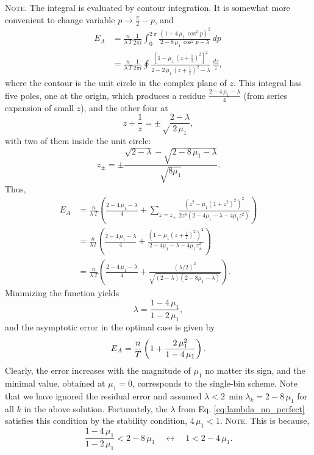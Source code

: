 \documentclass[reprint, floatfix]{revtex4-1}
\newcommand{\note}[1]{{\color{DarkGreen}\footnotesize \textsc{Note.} #1}}
\newcommand{\Err}{E}
\begin{document}
\note{The integral is evaluated by contour integration.
%
It is somewhat more convenient to change variable $p \to \frac{ \pi } { 2 } - p$,
and
$$
\begin{aligned}
\Err_A
&=
\frac{n}{\lambda \, T}
\frac{1}{2 \pi i}
\int_0^{2 \, \pi}
\frac{ \left(1 - 4 \, \mu_1 \, \cos^2 p \right)^2 }
{ 2 - 8 \, \mu_1 \, \cos^2 p - \lambda }
\, dp
\\
&=
\frac{n}{\lambda \, T}
\frac{1}{2 \pi i}
\oint
\frac{ \left[1 - \mu_1 \, \left(z+\frac{1}{z}\right)^2 \right]^2 }
{ 2 - 2 \, \mu_1 \, \left(z + \frac{1}{z}\right)^2 - \lambda }
\, \frac{dz}{z},
\end{aligned}
$$
where the contour is the unit circle
in the complex plane of $z$.
%
This integral has five poles, one at the origin,
which produces a residue
$\frac{2 - 4 \, \mu_1 - \lambda}{4}$
(from series expansion of small $z$),
and the other four at
$$
z + \frac{1}{z} = \pm\sqrt\frac{2-\lambda}{2 \, \mu_1},
$$
with two of them inside the unit circle:
$$
z_\pm = \pm \frac{\sqrt{2-\lambda} -\sqrt{2 - 8 \, \mu_1 - \lambda}}
{\sqrt{8 \mu_1}}.
$$
Thus,
$$
\begin{aligned}
\Err_A
&=
\frac{      n       }
     { \lambda \, T }
\left(
 \frac{ 2 - 4 \, \mu_1 - \lambda }
      {          4               }
 +
 \sum_{z = z_{\pm} }
 \frac{ \left(z^2 - \mu_1 (1 + z^2)^2 \right)^2 }
 { 2 z^4 (2 - 4 \mu_1 - \lambda - 4 \mu_1 z^2) }
\right)
\\
&=
\frac{       n      }
     { \lambda \, t }
\left(
  \frac{ 2 - 4 \, \mu_1 - \lambda }
       {          4               }
 +
 \frac{ \left(1 - \mu_1 \left(z + \frac{1}{z} \right)^2 \right)^2 }
      { 2 - 4 \mu_1 - \lambda - 4 \mu_1 z_{\pm}^2                 }
\right)
\\
&=
\frac{       n      }
     { \lambda \, T }
\left(
  \frac{ 2 - 4 \, \mu_1 - \lambda }
       {          4               }
 +
 \frac{ (\lambda/2)^2 }
 { \sqrt{(2-\lambda) (2 - 8 \mu_1 -\lambda)} }
\right).
\end{aligned}
$$
}
%
Minimizing the function yields
%
\begin{equation}
  \lambda
  =
  \frac{ 1 - 4 \, \mu_1 }
       { 1 - 2 \, \mu_1 }
  ,
\label{eq:lambda_nn_perfect}
\end{equation}
%
and the asymptotic error in the optimal case is given by
%
\begin{equation}
  \Err_A
  =
  \frac{n}{T}
  \left(
    1+ \frac{2 \, \mu_1^2}{1-4 \, \mu_1}
  \right)
  .
\notag
\end{equation}
%
Clearly, the error
increases with the magnitude of $\mu_1$
no matter its sign,
and the minimal value, obtained at $\mu_1 = 0$,
corresponds to the single-bin scheme.
%
Note that we have ignored the residual error
and assumed $\lambda < 2 \, \min \lambda_k = 2 - 8 \, \mu_1$
for all $k$ in the above solution.
%
Fortunately,
the $\lambda$ from Eq. \eqref{eq:lambda_nn_perfect}
satisfies this condition
by the stability condition,
$4 \, \mu_1 < 1$.
\note{This is because,
$$
\frac{ 1 - 4 \, \mu_1 } { 1 - 2 \, \mu_1 } < 2 - 8 \, \mu_1
\quad \leftrightarrow \quad
1 < 2 - 4 \, \mu_1.
$$
}
\end{document}
